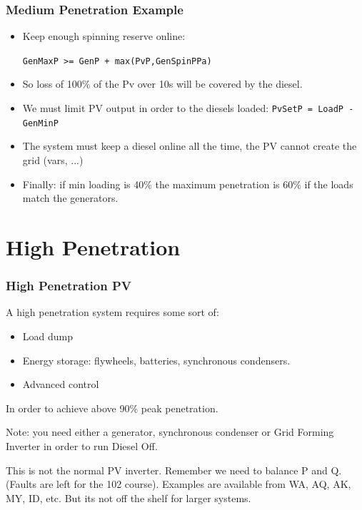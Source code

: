 \documentclass{beamer}
\begin{document}
\begin{frame}\frametitle{Medium Penetration Example}
  \begin{itemize}
  \item Keep enough spinning reserve online: 

    \texttt{GenMaxP >= GenP + max(PvP,GenSpinPPa)}
   \pause
  \item So loss of 100\% of the Pv over 10s will be covered by the
    diesel.
    \pause
  \item We must limit PV output in order to the diesels loaded:
    \texttt{PvSetP = LoadP - GenMinP}
    \pause
  \item The system must keep a diesel online all the time,
    the PV cannot create the grid (vars, ...)
    \pause
  \item Finally: if min loading is 40\% the maximum penetration
    is 60\% if the loads match the generators.
  \end{itemize}
\end{frame}

\section{High Penetration}
\begin{frame}\frametitle{High Penetration PV}
A high penetration system requires some sort of:

\begin{itemize}
\item Load dump
\item Energy storage: flywheels, batteries, synchronous condensers.
\item Advanced control
\end{itemize}

In order to achieve above 90\% peak penetration.
\pause

Note: you need either a generator, synchronous condenser or
Grid Forming Inverter in order to run Diesel Off. 

This is not the normal 
PV inverter. Remember we need to balance P and Q.
(Faults are left for the 102 course).
\pause 
\vfill
Examples are available from WA, AQ, AK, MY, ID, etc.
\vfill
But its not off the shelf for larger systems.
\end{frame}
\end{document}
